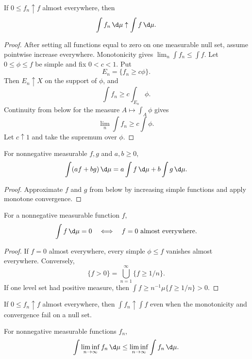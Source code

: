 \begin{thm}
If $0\leq f_n\uparrow f$ almost everywhere, then
\[
\int f_n\,\d\mu\uparrow\int f\,\d\mu.
\]
\end{thm}

\begin{proof}
After setting all functions equal to zero on one measurable null set, assume pointwise increase everywhere. Monotonicity gives $\lim_n\int f_n\leq\int f$. Let $0\leq\phi\leq f$ be simple and fix $0<c<1$. Put
\[
E_n=\{f_n\geq c\phi\}.
\]
Then $E_n\uparrow X$ on the support of $\phi$, and
\[
\int f_n\geq c\int_{E_n}\phi.
\]
Continuity from below for the measure $A\mapsto\int_A\phi$ gives
\[
\lim_n\int f_n\geq c\int\phi.
\]
Let $c\uparrow1$ and take the supremum over $\phi$.
\end{proof}

\begin{cor}
For nonnegative measurable $f,g$ and $a,b\geq0$,
\[
\int(af+bg)\,\d\mu
 =a\int f\,\d\mu+b\int g\,\d\mu.
\]
\end{cor}

\begin{proof}
Approximate $f$ and $g$ from below by increasing simple functions and apply monotone convergence.
\end{proof}

\begin{prop}
For a nonnegative measurable function $f$,
\[
\int f\,\d\mu=0
\quad\Longleftrightarrow\quad
f=0\text{ almost everywhere}.
\]
\end{prop}

\begin{proof}
If $f=0$ almost everywhere, every simple $\phi\leq f$ vanishes almost everywhere. Conversely,
\[
\{f>0\}=\bigcup_{n=1}^{\infty}\{f\geq1/n\}.
\]
If one level set had positive measure, then $\int f\geq n^{-1}\mu\{f\geq1/n\}>0$.
\end{proof}

\begin{cor}
If $0\leq f_n\uparrow f$ almost everywhere, then $\int f_n\uparrow\int f$ even when the monotonicity and convergence fail on a null set.
\end{cor}

\begin{thm}
For nonnegative measurable functions $f_n$,
\[
\int\liminf_{n\to\infty}f_n\,\d\mu
 \leq\liminf_{n\to\infty}\int f_n\,\d\mu.
\]
\end{thm}

